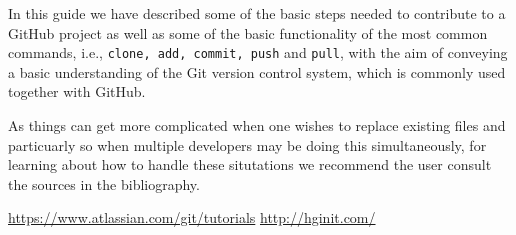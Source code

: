 \documentclass[11pt]{amsart}
\newcommand{\code}[1]{\texttt{#1}}
\begin{document}
In this guide we have described some of the basic steps needed to contribute to a GitHub project as well as some of the basic functionality of the most common commands, i.e., \code{clone, add, commit, push} and \code{pull}, with the aim of conveying a basic understanding of the Git version control system, which is commonly used together with GitHub. 

As things can get more complicated when one wishes to replace existing files and particuarly so when multiple developers may be doing this simultaneously, for learning about how to handle these situtations we recommend the user consult the sources in the bibliography. 

\renewcommand\refname{Bibliography}
\begin{thebibliography}{99}
     \url{https://www.atlassian.com/git/tutorials}
     \url{http://hginit.com/}
\end{thebibliography}
\end{document}
